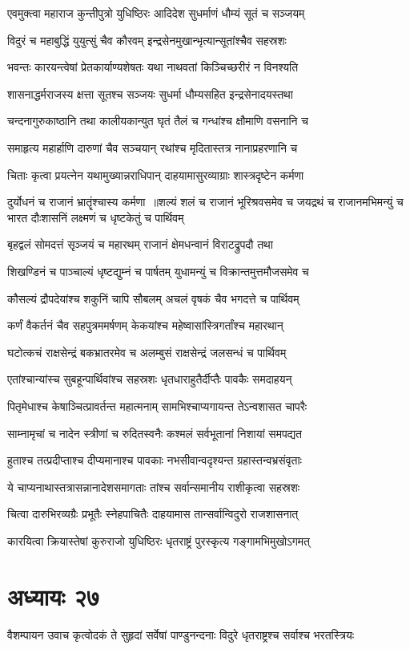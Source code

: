 \twolineshloka
{एवमुक्त्वा महाराज कुन्तीपुत्रो युधिष्ठिरः}
{आदिदेश सुधर्माणं धौम्यं सूतं च सञ्जयम्}


\twolineshloka
{विदुरं च महाबुद्धिं युयुत्सुं चैव कौरवम्}
{इन्द्रसेनमुखान्भृत्यान्सूतांश्चैव सहस्रशः}


\twolineshloka
{भवन्तः कारयन्त्वेषां प्रेतकार्याण्यशेषतः}
{यथा नाथवतां किञ्चिच्छरीरं न विनश्यति}


\twolineshloka
{शासनाद्धर्मराजस्य क्षत्ता सूतश्च सञ्जयः}
{सुधर्मा धौम्यसहित इन्द्रसेनादयस्तथा}


\twolineshloka
{चन्दनागुरुकाष्ठानि तथा कालीयकान्युत}
{घृतं तैलं च गन्धांश्च क्षौमाणि वसनानि च}


\twolineshloka
{समाहृत्य महार्हाणि दारुणां चैव सञ्चयान्}
{रथांश्च मृदितास्तत्र नानाप्रहरणानि च}


\twolineshloka
{चिताः कृत्वा प्रयत्नेन यथामुख्यान्नराधिपान्}
{दाहयामासुरव्याग्राः शास्त्रदृष्टेन कर्मणा}


दुर्योधनं च राजानं भ्रातॄंश्चास्य कर्मणा ॥शल्यं शलं च राजानं भूरिश्रवसमेव च
\twolineshloka
{जयद्रथं च राजानमभिमन्युं च भारत}
{दौःशासनिं लक्ष्मणं च धृष्टकेतुं च पार्थिवम्}


\twolineshloka
{बृहद्वलं सोमदत्तं सृञ्जयं च महारथम्}
{राजानं क्षेमधन्वानं विराटद्रुपदौ तथा}


\twolineshloka
{शिखण्डिनं च पाञ्चाल्यं धृष्टद्युम्नं च पार्षतम्}
{युधामन्युं च विक्रान्तमुत्तमौजसमेव च}


\twolineshloka
{कौसल्यं द्रौपदेयांश्च शकुनिं चापि सौबलम्}
{अचलं वृषकं चैव भगदत्ते च पार्थिवम्}


\twolineshloka
{कर्णं वैकर्तनं चैव सहपुत्रममर्षणम्}
{केकयांश्च महेष्वासांस्त्रिगर्तांश्च महारथान्}


\twolineshloka
{घटोत्कचं राक्षसेन्द्रं बकभ्रातरमेव च}
{अलम्बुसं राक्षसेन्द्रं जलसन्धं च पार्थिवम्}


\threelineshloka
{एतांश्चान्यांस्च सुबहून्पार्थिवांश्च सहस्रशः}
{धृतधाराहुतैर्दीप्तैः पावकैः समदाहयन्}
{}


\twolineshloka
{पितृमेधाश्च केषाञ्चित्प्रावर्तन्त महात्मनाम्}
{सामभिश्चाप्यगायन्त तेऽन्वशासत चापरैः}


\twolineshloka
{साम्नामृचां च नादेन स्त्रीणां च रुदितस्वनैः}
{कश्मलं सर्वभूतानां निशायां समपद्यत}


\twolineshloka
{हुताश्च तत्प्रदीप्ताश्च दीप्यमानाश्च पावकाः}
{नभसीवान्वदृश्यन्त ग्रहास्तन्वभ्रसंवृताः}


\twolineshloka
{ये चाप्यनाथास्तत्रासन्नानादेशसमागताः}
{तांश्च सर्वान्समानीय राशीकृत्वा सहस्रशः}


\twolineshloka
{चित्वा दारुभिरव्यग्रैः प्रभूतैः स्नेहपाचितैः}
{दाहयामास तान्सर्वान्विदुरो राजशासनात्}


\twolineshloka
{कारयित्वा क्रियास्तेषां कुरुराजो युधिष्ठिरः}
{धृतराष्ट्रं पुरस्कृत्य गङ्गामभिमुखोऽगमत्}


\chapter{अध्यायः २७}
\threelineshloka
{वैशम्पायन उवाच}
{कृत्वोदकं ते सुहृदां सर्वेषां पाण्डुनन्दनाः}
{विदुरे धृतराष्ट्रश्च सर्वाश्च भरतस्त्रियः}


